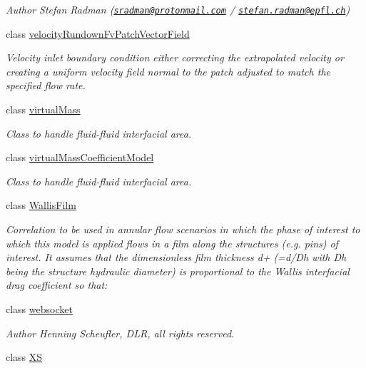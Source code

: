 \begin{DoxyCompactItemize}
\begin{DoxyCompactList}\small\item\em Author Stefan Radman (\href{mailto:sradman@protonmail.com}{\tt sradman@protonmail.\+com} / \href{mailto:stefan.radman@epfl.ch}{\tt stefan.\+radman@epfl.\+ch}) \end{DoxyCompactList}\item 
class \hyperlink{classFoam_1_1velocityRundownFvPatchVectorField}{velocity\+Rundown\+Fv\+Patch\+Vector\+Field}
\begin{DoxyCompactList}\small\item\em Velocity inlet boundary condition either correcting the extrapolated velocity or creating a uniform velocity field normal to the patch adjusted to match the specified flow rate. \end{DoxyCompactList}\item 
class \hyperlink{classFoam_1_1virtualMass}{virtual\+Mass}
\begin{DoxyCompactList}\small\item\em Class to handle fluid-\/fluid interfacial area. \end{DoxyCompactList}\item 
class \hyperlink{classFoam_1_1virtualMassCoefficientModel}{virtual\+Mass\+Coefficient\+Model}
\begin{DoxyCompactList}\small\item\em Class to handle fluid-\/fluid interfacial area. \end{DoxyCompactList}\item 
class \hyperlink{classFoam_1_1WallisFilm}{Wallis\+Film}
\begin{DoxyCompactList}\small\item\em Correlation to be used in annular flow scenarios in which the phase of interest to which this model is applied flows in a film along the structures (e.\+g. pins) of interest. It assumes that the dimensionless film thickness d+ (=d/\+Dh with Dh being the structure hydraulic diameter) is proportional to the Wallis interfacial drag coefficient so that\+: \end{DoxyCompactList}\item 
class \hyperlink{classFoam_1_1websocket}{websocket}
\begin{DoxyCompactList}\small\item\em Author Henning Scheufler, D\+LR, all rights reserved. \end{DoxyCompactList}\item 
class \hyperlink{classFoam_1_1XS}{XS}

\end{DoxyCompactItemize}
